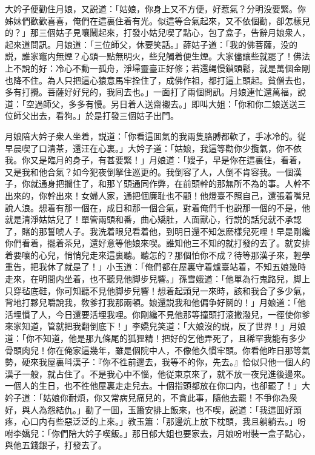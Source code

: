 大妗子便勸住月娘，又説道：「姑娘，你身上又不方便，好惹氣？分明没要緊。你姊妹們歡歡喜喜，俺們在這裏住着有光。似這等合氣起來，又不依個勸，卻怎樣兒的？」那三個姑子見嚷鬧起來，打發小姑兒喫了點心，包了盒子，告辭月娘衆人，起來道問訊。月娘道：「三位師父，休要笑話。」薛姑子道：「我的佛菩薩，没的説，誰家竈内無煙？心頭一點無明火，些兒觸着便生煙。大家儘讓些就罷了！佛法上不說的好：冷心不動一孤舟，淨埽靈臺正好修；若還䋲慢鎖頭鬆，就是萬個金剛也降不住。為人只把這心猿意馬牢拴住了，成佛作祖，都打這上頭起。貧僧去也，多有打攪。菩薩好好兒的，我囘去也。」一面打了兩個問訊。月娘連忙還萬福，說道：「空過師父，多多有慢。另日着人送齋襯去。」即叫大姐：「你和你二娘送送三位師父出去，看狗。」於是打發三個姑子出門。

月娘陪大妗子衆人坐着，説道：「你看這囬氣的我兩隻胳膊都軟了，手冰冷的。従早晨喫了口清茶，還汪在心裏。」大妗子道：「姑娘，我這等勸你少攬氣，你不依我。你又是臨月的身子，有甚要緊！」月娘道：「嫂子，早是你在這裏住，看着，又是我和他合氣？如今犯夜倒拏住巡更的。我倒容了人，人倒不肯容我。一個漢子，你就通身把攔住了，和那丫頭通同作弊，在前頭幹的那無所不為的事。人幹不出來的，你幹出來！女婦人家，通把個廉耻也不顧！他燈臺不照自己，還張着嘴兒說人浪。想着有那一個在，成日和那一個合氣，對着俺們千也説那一個的不是，他就是清淨姑姑兒了！單管兩頭和番，曲心矯肚，人面獸心，行説的話兒就不承認了，賭的那誓唬人子。我洗着眼兒看着他，到明日還不知怎麽樣兒死哩！早是剛纔你們看着，擺着茶兒，還好意等他娘來喫。誰知他三不知的就打發的去了。就安排着要嚷的心兒，悄悄兒走來這裏聽。聽怎的？那個怕你不成？待等那漢子來，輕學重告，把我休了就是了！」小玉道：「俺們都在屋裏守着爐臺站着，不知五娘幾時走來，在明間内坐着，也不聽見他脚步兒響。」孫雪娥道：「他單為行鬼路兒，脚上只穿毡底鞋，你可知聽不見他脚步兒響！想着起頭兒一來時，該和我合了多少氣，背地打夥兒嚼說我，敎爹打我那兩頓。娘還説我和他偏争好鬬的！」月娘道：「他活埋慣了人，今日還要活埋我哩。你剛纔不見他那等撞頭打滚撒潑兒，一徑使你爹來家知道，管就把我翻倒底下！」李嬌兒笑道：「大娘沒的説，反了世界！」月娘道：「你不知道，他是那九條尾的狐狸精！把好的乞他弄死了，且稀罕我能有多少骨頭肉兒！你在俺家這幾年，雖是個院中人，不像他久慣牢頭。你看他昨日那等氣勢，硬來我屋裏呌漢子：『你不徃前邊去，我等不的你，先去。』恰似只他一個人的漢子一般，就占住了。不是我心中不惱，他従東京來了，就不放一夜兒進後邊來。一個人的生日，也不徃他屋裏走走兒去。十個指頭都放在你口内，也卻罷了！」大妗子道：「姑娘你耐煩，你又常病兒痛兒的，不貪此事，隨他去罷！不爭你為衆好，與人為怨結仇。」勸了一囬，玉簫安排上飯來，也不喫，説道：「我這囬好頭疼，心口内有些惡泛泛的上來。」教玉簫：「那邊炕上放下枕頭，我且躺躺去。」吩咐李嬌兒：「你們陪大妗子喫飯。」那日郁大姐也要家去，月娘吩咐裝一盒子點心，與他五錢銀子，打發去了。

